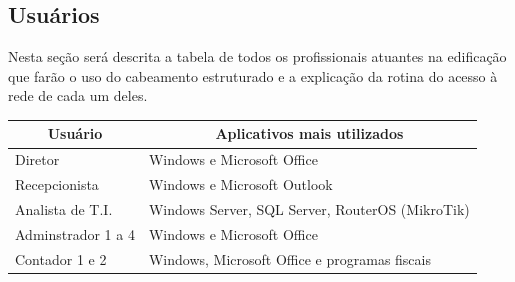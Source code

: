 \documentclass[	DIV=calc,%
							paper=a4,%
							fontsize=12pt,%
							onecolumn]{scrartcl}	 					%
\begin{document}
\subsection{Usuários}

Nesta seção será descrita a tabela de todos os profissionais atuantes na edificação que farão o uso do cabeamento estruturado e a explicação da rotina do acesso à rede de cada um deles.


\begin{table}[H]
	\centering
	\renewcommand{\arraystretch}{2.0}
	\begin{tabular}{|l|l|}
		\hline
		\multicolumn{1}{|c|}{\textbf{Usuário}} &	 \multicolumn{1}{|c|}{\textbf{Aplicativos mais utilizados}}                                 		  \\ \hline		Diretor                                
		& Windows e Microsoft Office                                              \\ \hline
		Recepcionista                               
		& Windows e Microsoft Outlook            					\\ \hline
		Analista de T.I.                                  
		& Windows Server, SQL Server, RouterOS (MikroTik)          \\ \hline
		Adminstrador 1 a 4 
		& Windows e Microsoft Office         \\ \hline
		Contador 1 e 2                                  
		& Windows, Microsoft Office e programas fiscais    \\ \hline
	\end{tabular}
\end{table}

\end{document}
